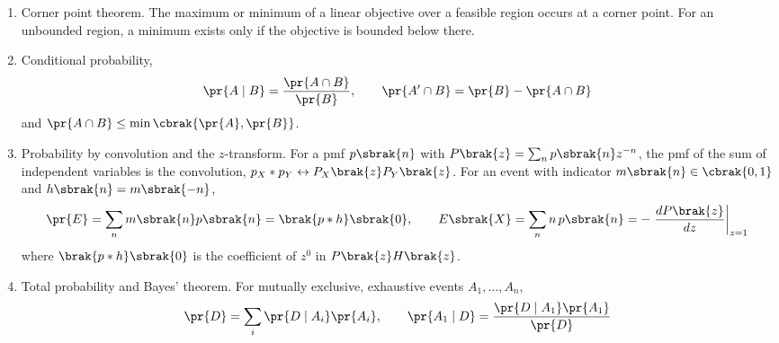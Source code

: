 \begin{enumerate}[label=\thesubsection.\arabic*, ref=\thesubsection.\theenumi]
\item Corner point theorem. The maximum or minimum of a linear objective over a feasible region occurs at a corner point. For an unbounded region, a minimum exists only if the objective is bounded below there. 
\item Conditional probability,
\begin{align}
	\pr{A\mid B} = \frac{\pr{A\cap B}}{\pr{B}}, \qquad \pr{A^{\prime}\cap B} = \pr{B} - \pr{A\cap B} \label{eq:CBSE12-cond}
\end{align}
and $\pr{A\cap B} \le \min\cbrak{\pr{A},\pr{B}}$. 
\item Probability by convolution and the $z$-transform. For a pmf $p\sbrak{n}$ with $P\brak{z} = \sum_n p\sbrak{n}z^{-n}$, the pmf of the sum of independent variables is the convolution, $p_X * p_Y \leftrightarrow P_X\brak{z}P_Y\brak{z}$. For an event with indicator $m\sbrak{n} \in \cbrak{0,1}$ and $h\sbrak{n} = m\sbrak{-n}$,
\begin{align}
	\pr{E} = \sum_n m\sbrak{n}p\sbrak{n} = \brak{p*h}\sbrak{0}, \qquad E\sbrak{X} = \sum_n n\,p\sbrak{n} = -\left.\frac{dP\brak{z}}{dz}\right|_{z=1} \label{eq:CBSE12-pmf}
\end{align}
where $\brak{p*h}\sbrak{0}$ is the coefficient of $z^{0}$ in $P\brak{z}H\brak{z}$.
\item Total probability and Bayes' theorem. For mutually exclusive, exhaustive events $A_1, \dots, A_n$,
\begin{align}
	\pr{D} = \sum_i \pr{D\mid A_i}\pr{A_i}, \qquad
	\pr{A_1\mid D} = \frac{\pr{D\mid A_1}\pr{A_1}}{\pr{D}} \label{eq:CBSE12-bayes}
\end{align}
\end{enumerate}
